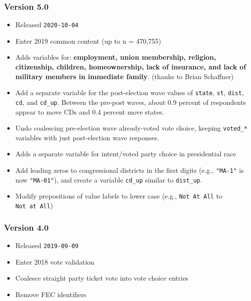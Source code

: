 \documentclass[10pt,article,oneside]{memoir}
\theoremstyle{definition}
\begin{document}
\hypertarget{version-5.0}{%
\subsubsection{Version 5.0}\label{version-5.0}}

\begin{itemize}
\tightlist
\item
  Released \texttt{2020-10-04}
\item
  Enter 2019 common content (up to n = 470,755)
\item
  Adds variables for: \textbf{employment, union membership, religion,
  citizenship, children, homeownership, lack of insurance, and lack of
  military members in immediate family}. (thanks to Brian Schaffner)
\item
  Add a separate variable for the post-election wave values of
  \texttt{state}, \texttt{st}, \texttt{dist}, \texttt{cd}, and
  \texttt{cd\_up}. Between the pre-post waves, about 0.9 percent of
  respondents appear to move CDs and 0.4 percent move states.
\item
  Undo coalescing pre-election wave already-voted vote choice, keeping
  \texttt{voted\_*} variables with just post-election wave responses.
\item
  Adds a separate variable for intent/voted party choice in presidential
  race
\item
  Add leading zeros to congressional districts in the first digits
  (e.g., \texttt{"MA-1"} is now \texttt{"MA-01"}), and create a variable
  \texttt{cd\_up} similar to \texttt{dist\_up}.
\item
  Modify prepositions of value labels to lower case (e.g.,
  \texttt{Not\ At\ All} to \texttt{Not\ at\ All})
\end{itemize}

\hypertarget{version-4.0}{%
\subsubsection{Version 4.0}\label{version-4.0}}

\begin{itemize}
\tightlist
\item
  Released \texttt{2019-09-09}
\item
  Enter 2018 vote validation
\item
  Coalesce straight party ticket vote into vote choice entries
\item
  Remove FEC identifiers
\end{itemize}
\end{document}
